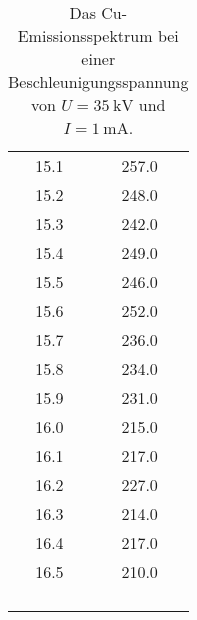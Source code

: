 \begin{table}
\begin{tabular}{S S}
    15.1 & 257.0 \\
    15.2 & 248.0 \\
    15.3 & 242.0 \\
    15.4 & 249.0 \\
    15.5 & 246.0 \\
    15.6 & 252.0 \\
    15.7 & 236.0 \\
    15.8 & 234.0 \\
    15.9 & 231.0 \\
    16.0 & 215.0 \\
    16.1 & 217.0 \\
    16.2 & 227.0 \\
    16.3 & 214.0 \\
    16.4 & 217.0 \\
    16.5 & 210.0 \\
         &       \\
         &       \\
         &       \\
         &       \\
    \bottomrule 
    \end{tabular}
\caption{Das Cu-Emissionsspektrum bei einer Beschleunigungsspannung von $U=\SI{35}{\kilo\volt}$ und $I=\SI{1}{\milli\ampere}$.}
\label{tab:spektrum1}
\end{table}

